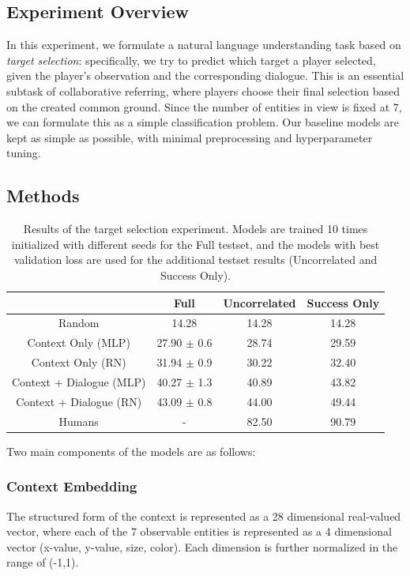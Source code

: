 \documentclass[letterpaper]{article} %
\begin{document}
\subsection{Experiment Overview}

In this experiment, we formulate a natural language understanding task based on \textit{target selection}: specifically, we try to predict which target a player selected, given the player's observation and the corresponding dialogue. This is an essential subtask of collaborative referring, where players choose their final selection based on the created common ground. Since the number of entities in view is fixed at 7, we can formulate this as a simple classification problem. Our baseline models are kept as simple as possible, with minimal preprocessing and hyperparameter tuning.

\subsection{Methods}

\begin{table}[htb!]
\centering \small
\begin{tabular}{c|ccc}
\toprule
& Full & Uncorrelated & Success Only \\
\midrule
Random & 14.28 & 14.28 & 14.28 \\
\midrule
Context Only (MLP) & 27.90 $\pm$ 0.6 & 28.74 & 29.59 \\
Context Only (RN) & 31.94 $\pm$ 0.9 & 30.22 & 32.40 \\
Context + Dialogue (MLP) & 40.27 $\pm$ 1.3 & 40.89 & 43.82 \\
Context + Dialogue (RN) & 43.09 $\pm$ 0.8 & 44.00 & 49.44 \\
\midrule
Humans & - & 82.50 & 90.79 \\
\bottomrule
\end{tabular}
\vspace{-0.74mm}
\caption{\label{selection_experiment}
Results of the target selection experiment. Models are trained 10 times initialized with different seeds for the Full testset, and the models with best validation loss are used for the additional testset results (Uncorrelated and Success Only).
}
\end{table}

Two main components of the models are as follows:

\subsubsection{Context Embedding}
The structured form of the context is represented as a 28 dimensional real-valued vector, where each of the 7 observable entities is represented as a 4 dimensional vector (x-value, y-value, size, color). Each dimension is further normalized in the range of (-1,1).
\end{document}
